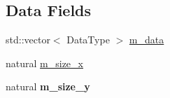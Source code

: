 \subsection*{Data Fields}
\begin{DoxyCompactItemize}
\item 
std\+::vector$<$ Data\+Type $>$ \hyperlink{classez_1_1maths_1_1Matrix_a185697a4eb9527a6c3f0ecf59975f181}{m\+\_\+data}
\item 
natural \hyperlink{classez_1_1maths_1_1Matrix_a57afd79b657d3ca032728559e0674000}{m\+\_\+size\+\_\+x}
\item 
\mbox{\label{classez_1_1maths_1_1Matrix_a8ec6800329545f6c5c2658c44b0c718b}} 
natural {\bfseries m\+\_\+size\+\_\+y}
\end{DoxyCompactItemize}
